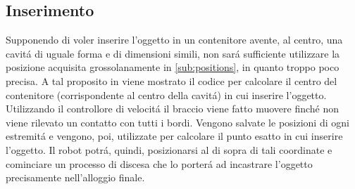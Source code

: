 \subsection{Inserimento}
Supponendo di voler inserire l'oggetto in un contenitore avente, al centro, una cavit\'{a} di uguale forma e di dimensioni simili, 
non sar\'{a} sufficiente utilizzare la posizione acquisita grossolanamente in \ref{sub:positions}, in quanto troppo poco precisa. 
A tal proposito in \cite{insertion} viene mostrato il codice per calcolare il centro del contenitore (corrispondente al 
centro della cavit\'{a}) in cui inserire l'oggetto. Utilizzando il controllore di velocit\'{a} il braccio viene fatto muovere 
finch\'{e} non viene rilevato un contatto con tutti i bordi. Vengono salvate le posizioni di ogni estremit\'{a} e vengono, poi, 
utilizzate per calcolare il punto esatto in cui inserire l'oggetto. Il robot potr\'{a}, quindi, posizionarsi al di sopra di 
tali coordinate e cominciare un processo di discesa che lo porter\'{a} ad incastrare l'oggetto precisamente nell'alloggio finale.
